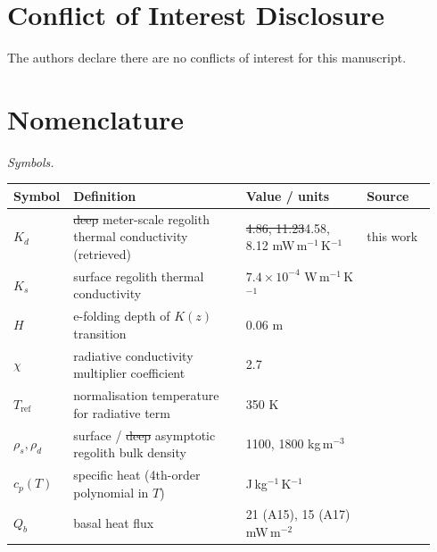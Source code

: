 \documentclass[11pt]{article}
\makeatletter
\renewcommand{\arraystretch}{1.15}
\let\sout@orig\sout
\renewcommand{\sout}[1]{\ifmmode\text{\sout@orig{\ensuremath{#1}}}\else\sout@orig{#1}\fi}
\newcommand{\new}[1]{\textcolor{green!60!black}{#1}}
\newcommand{\old}[1]{\textcolor{red!70!black}{\sout{#1}}}
\newcommand{\new}[1]{\textcolor{green!60!black}{#1}}
\newcommand{\old}[1]{}
\newcommand{\new}[1]{#1}
\newcommand{\old}[1]{}
\makeatother
\begin{document}
\section*{Conflict of Interest Disclosure}
The authors declare there are no conflicts of interest for this manuscript.

\section*{Nomenclature}
\label{sec:nomenclature}
{\small
\setlength{\tabcolsep}{4pt}
\renewcommand{\arraystretch}{1.0}

\noindent\textit{Symbols.}\par\smallskip\noindent
\begin{tabular}{@{}p{0.10\linewidth}p{0.40\linewidth}p{0.28\linewidth}p{0.16\linewidth}@{}}
\toprule
\textbf{Symbol} & \textbf{Definition} & \textbf{Value / units} & \textbf{Source} \\
\midrule
$K_d$              & \old{deep }\new{meter-scale }regolith thermal conductivity (retrieved)        & \old{4.86, 11.23}\new{4.58, 8.12} mW\,m$^{-1}$\,K$^{-1}$         & this work \\
$K_s$              & surface regolith thermal conductivity                  & $7.4\times10^{-4}$ W\,m$^{-1}$\,K$^{-1}$  & \citet{hayne2017} \\
$H$                & e-folding depth of $K(z)$ transition                  & 0.06 m                                       & \citet{hayne2017} \\
$\chi$             & radiative conductivity multiplier coefficient         & 2.7                                          & \citet{hayne2017} \\
$T_\mathrm{ref}$   & normalisation temperature for radiative term          & 350 K                                        & \citet{hayne2017} \\
$\rho_s,\rho_d$    & surface / \old{deep }\new{asymptotic }regolith bulk density                  & 1100, 1800 kg\,m$^{-3}$                      & \citet{hayne2017} \\
$c_p(T)$           & specific heat (4th-order polynomial in $T$)           & J\,kg$^{-1}$\,K$^{-1}$                       & \citet{hemingway1973,hayne2017} \\
$Q_b$              & basal heat flux                                       & 21 (A15), 15 (A17) mW\,m$^{-2}$              & \citet{langseth1976,nagihara2018} \\

\end{tabular}}
\end{document}
